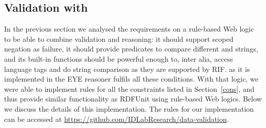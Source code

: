 \subsection{Validation with \nthreelogic}\label{n3}
In the previous section we analysed the requirements
on a rule-based Web logic to be able to combine validation and reasoning:
it should support scoped 
negation as failure, it should provide predicates to compare different \uris and strings, and its built-in functions should be powerful enough to, inter alia, 
access language tags
and do string comparison as they are supported by RIF.
\nthreelogic as it is implemented in the EYE reasoner \cite{eyepaper} fulfils all these conditions. 
With that logic, we were able to implement rules for all the constraints listed in Section~\ref{cons}, and thus 
provide similar functionality as RDFUnit using rule-based Web logics.
Below we discuss the
details of this implementation. %
The rules for our implementation can be accessed at \url{https://github.com/IDLabResearch/data-validation}. 



